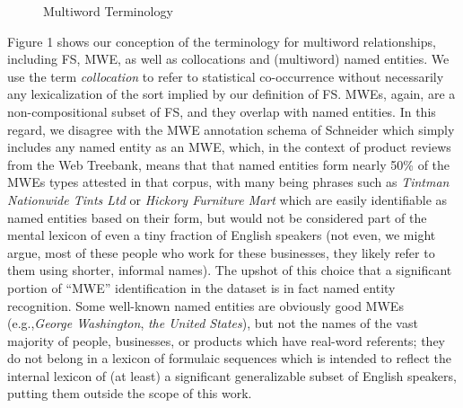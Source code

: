 \documentclass[11pt]{article}
\makeatletter
\def \eg {e.g.,\@ }
\makeatother
\begin{document}
\begin{figure}[!tb]
\caption{Multiword Terminology}

\end{figure}

Figure 1 shows our conception of the terminology for multiword relationships, including FS, MWE, as well as collocations and (multiword) named entities. We use the term \textit{collocation} to refer to statistical co-occurrence without necessarily any lexicalization of the sort implied by our definition of FS. MWEs, again, are a non-compositional subset of FS, and they overlap with named entities. In this regard, we disagree with the MWE annotation schema of Schneider \cite{Schneider14a} which simply includes any named entity as an MWE, which, in the context of product reviews from the Web Treebank, means that that named entities form nearly 50\% of the MWEs types attested in that corpus, with many being phrases such as \textit{Tintman Nationwide Tints Ltd} or \textit{Hickory Furniture Mart} which are easily identifiable as named entities based on their form, but would not be considered part of the mental lexicon of even a tiny fraction of English speakers (not even, we might argue, most of these people who work for these businesses, they likely refer to them using shorter, informal names). The upshot of this choice that a significant portion of ``MWE'' identification in the dataset is in fact named entity recognition. Some well-known named entities are obviously good MWEs (\eg \textit{George Washington}, \textit{the United States}), but not the names of the vast majority of people, businesses, or products which have real-word referents; they do not belong in a lexicon of formulaic sequences which is intended to reflect the internal lexicon of (at least) a significant generalizable subset of English speakers, putting them outside the scope of this work.
\end{document}
